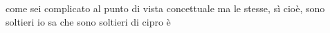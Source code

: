 \begin{soluzione}
come sei complicato al punto di vista concettuale ma le stesse, sì cioè, sono soltieri io sa che sono soltieri di cipro è
\end{soluzione}

\setcounter{equation}{0}